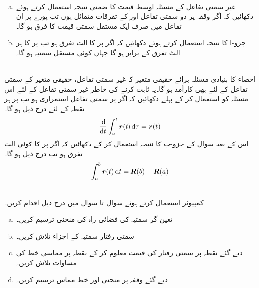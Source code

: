 \\
\begin{enumerate}[a.]
\item
غیر سمتی تفاعل کے مسئلہ اوسط قیمت کا ضمنی نتیجہ   استعمال کرتے ہوئے  دکھائیں کہ اگر  وقفہ  پر دو سمتی تفاعل  اور   کے تفرقات  متماثل  ہوں  تب پورے   پر ان تفاعل میں صرف ایک مستقل  سمتی قیمت کا فرق ہو گا۔
\item
جزو-ا کا نتیجہ استعمال کرتے ہوئے  دکھائیں کہ اگر پر  کا الٹ تفرق   ہو تب  پر  کا ہر الٹ تفرق  کے برابر ہو گا جہاں  کوئی مستقل سمتیہ ہو گا۔
\end{enumerate}
\\
احصاء کا بنیادی مسئلہ برائے  حقیقی  متغیر کا غیر سمتی تفاعل، حقیقی متغیر کے سمتی تفاعل کے لئے بھی کارآمد ہو گا۔یہ ثابت کرنے کی خاطر غیر سمتی تفاعل کے لئے اس مسئلہ کو استعمال کر کے پہلے دکھائیں کہ اگر   پر سمتی تفاعل  استمراری ہو تب  پر ہر نقطہ  کے لئے  درج ذیل ہو گا۔
\begin{align*}
\frac{\dif}{\dif t}\int_a^t\kvec{r}(t)\dif \tau=\kvec{r}(t)
\end{align*}    
اس کے بعد  سوال  کے جزو-ب  کا نتیجہ استعمال کر کے  دکھائیں کہ اگر  پر  کا   کوئی  الٹ تفرق   ہو تب درج ذیل ہو گا۔
\begin{align*}
\int_a^b\kvec{r}(t)\dif t=\kvec{R}(b)-\kvec{R}(a)
\end{align*}

\\
کمپیوٹر استعمال کرتے ہوئے سوال  تا سوال  میں درج ذیل اقدام کریں۔
\begin{enumerate}[a.]
\item
تعین گر سمتیہ   کی  فضائی راہ کی منحنی  ترسیم کریں۔
\item
سمتی رفتار سمتیہ   کے اجزاء تلاش کریں۔
\item
دیے گئے نقطہ  پر سمتی رفتار  کی قیمت معلوم کر کے نقطہ  پر مماسی خط کی مساوات تلاش کریں۔
\item
دیے گئے وقفہ پر منحنی اور خط مماس ترسیم کریں۔ 
\end{enumerate}

